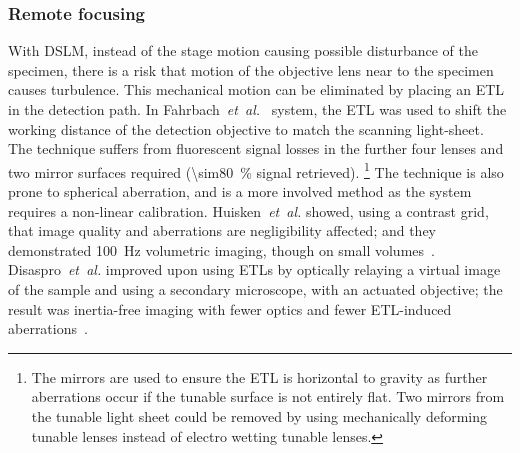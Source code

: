 \subsubsection{Remote focusing}

With \gls{DSLM}, instead of the stage motion causing possible disturbance of the specimen, there is a risk that motion of the objective lens near to the specimen causes turbulence.
This mechanical motion can be eliminated by placing an
\gls{ETL} in the detection path.
In Fahrbach~\emph{et~al.}~\cite{fahrbachRapid3DLightsheet2013} system, the \gls{ETL} was used to shift the \gls{working distance} of the detection objective to match the scanning \gls{light-sheet}.
The technique suffers from fluorescent signal losses in the further four lenses and two mirror surfaces required (\SI{\sim80}{\%} signal retrieved).
\footnote{The mirrors are used to ensure the \gls{ETL} is horizontal to gravity as further aberrations occur if the tunable surface is not entirely flat.
Two mirrors from the tunable light sheet could be removed by using mechanically deforming tunable lenses instead of electro wetting tunable lenses.}
The technique is also prone to spherical aberration, and is a more involved method as the system requires a non-linear calibration.
Huisken~\emph{et~al.} showed, using a contrast grid, that image quality and aberrations are negligibility affected;
and they demonstrated
\SI{100}{\hertz} volumetric imaging, though on small volumes~\cite{fahrbachRapid3DLightsheet2013}.
Disaspro~\emph{et~al.} improved upon using \gls{ETL}s by optically relaying a virtual image of the sample and using a secondary microscope, with an actuated objective; the result was inertia-free imaging with fewer optics and fewer \gls{ETL}-induced aberrations~\cite{duocastellaFastInertiaFreeVolumetric2017c}.



